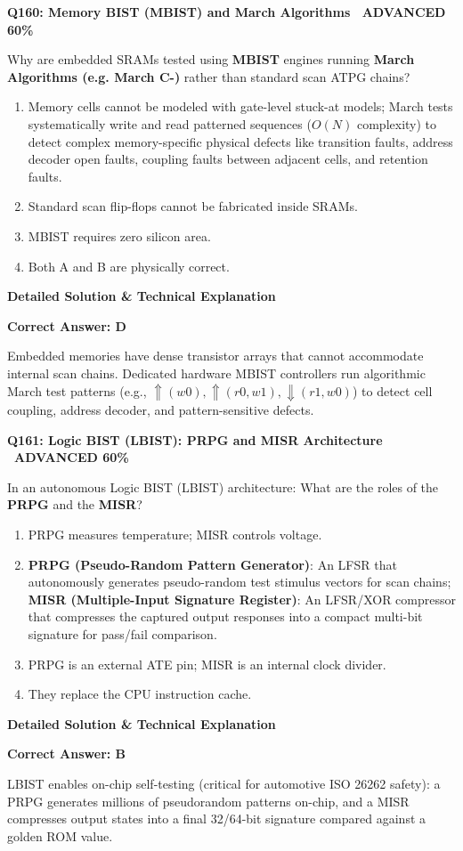 \documentclass[11pt,a4paper]{article}
\newcommand{\badgeadv}{{\color{white}\colorbox{advred}{\bfseries\sffamily\tiny\ ADVANCED 60\%\ }}}
\newenvironment{qbox}[2]{%
  \begin{mdframed}[style=qstyle]%
  {\bfseries\sffamily\color{primaryblue}#1 \hfill #2}\par\vspace{2pt}%
}{%
  \end{mdframed}%
}
\newenvironment{ansbox}{%
  \begin{mdframed}[style=ansstyle]%
  {\bfseries\sffamily\color{ansgreen}\small Detailed Solution \& Technical Explanation}\par\vspace{2pt}\small%
}{%
  \end{mdframed}%
}
\begin{document}
\begin{qbox}{Q160: Memory BIST (MBIST) and March Algorithms}{\badgeadv}
Why are embedded SRAMs tested using \textbf{MBIST} engines running \textbf{March Algorithms (e.g. March C-)} rather than standard scan ATPG chains?
\begin{enumerate}[label=\textbf{\Alph*.}]
  \item Memory cells cannot be modeled with gate-level stuck-at models; March tests systematically write and read patterned sequences ($O(N)$ complexity) to detect complex memory-specific physical defects like transition faults, address decoder open faults, coupling faults between adjacent cells, and retention faults.
  \item Standard scan flip-flops cannot be fabricated inside SRAMs.
  \item MBIST requires zero silicon area.
  \item Both A and B are physically correct.
\end{enumerate}
\end{qbox}
\begin{ansbox}
\textbf{Correct Answer: D}

Embedded memories have dense transistor arrays that cannot accommodate internal scan chains. Dedicated hardware MBIST controllers run algorithmic March test patterns (e.g., $\Uparrow(w0), \Uparrow(r0,w1), \Downarrow(r1,w0)$) to detect cell coupling, address decoder, and pattern-sensitive defects.
\end{ansbox}

\begin{qbox}{Q161: Logic BIST (LBIST): PRPG and MISR Architecture}{\badgeadv}
In an autonomous Logic BIST (LBIST) architecture:
What are the roles of the \textbf{PRPG} and the \textbf{MISR}?
\begin{enumerate}[label=\textbf{\Alph*.}]
  \item PRPG measures temperature; MISR controls voltage.
  \item \textbf{PRPG (Pseudo-Random Pattern Generator)}: An LFSR that autonomously generates pseudo-random test stimulus vectors for scan chains; \textbf{MISR (Multiple-Input Signature Register)}: An LFSR/XOR compressor that compresses the captured output responses into a compact multi-bit signature for pass/fail comparison.
  \item PRPG is an external ATE pin; MISR is an internal clock divider.
  \item They replace the CPU instruction cache.
\end{enumerate}
\end{qbox}
\begin{ansbox}
\textbf{Correct Answer: B}

LBIST enables on-chip self-testing (critical for automotive ISO 26262 safety): a PRPG generates millions of pseudorandom patterns on-chip, and a MISR compresses output states into a final 32/64-bit signature compared against a golden ROM value.
\end{ansbox}
\end{document}
